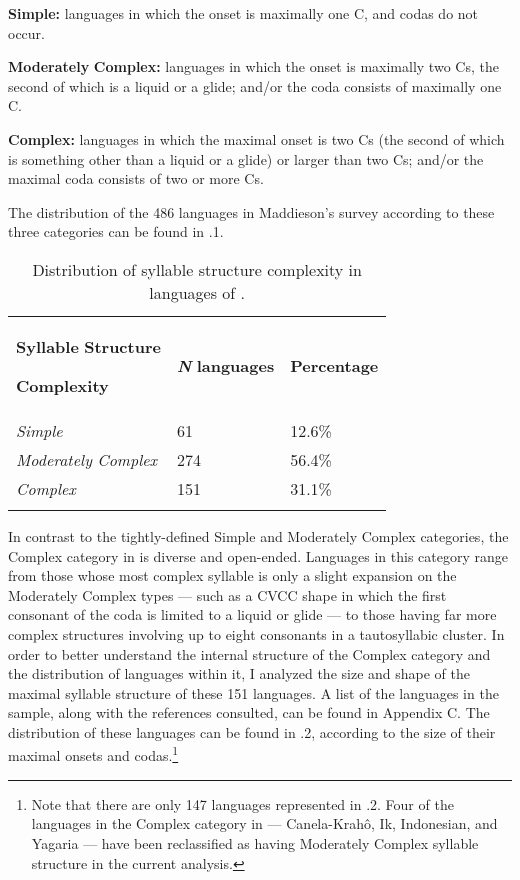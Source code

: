 \textbf{Simple:} languages in which the onset is maximally one C, and codas do not occur.



\textbf{Moderately} \textbf{Complex:} languages in which the onset is maximally two Cs, the second of which is a liquid or a glide; and/or the coda consists of maximally one C.



\textbf{Complex:} languages in which the maximal onset is two Cs (the second of which is something other than a liquid or a glide) or larger than two Cs; and/or the maximal coda consists of two or more Cs.



The distribution of the 486 languages in Maddieson's survey according to these three categories can be found in .1.






\begin{table}
\begin{tabularx}{\textwidth}{XXX}
\lsptoprule

\textbf{Syllable} \textbf{Structure} 

\textbf{Complexity} & \textbf{\textit{N}} \textbf{languages} & \textbf{Percentage}\\
\textit{Simple} & 61 & 12.6\%\\
\textit{Moderately} \textit{Complex} & 274 & 56.4\%\\
\textit{Complex} & 151 & 31.1\%\\
\lspbottomrule
\end{tabularx}
\caption{\label{tab:key:2.1.} Distribution of syllable structure complexity in languages of \citet{Maddieson2013a}.}
\end{table}




  In contrast to the tightly-defined Simple and Moderately Complex categories, the Complex category in \citet{Maddieson2013a} is diverse and open-ended. Languages in this category range from those whose most complex syllable is only a slight expansion on the Moderately Complex types — such as a CVCC shape in which the first consonant of the coda is limited to a liquid or glide — to those having far more complex structures involving up to eight consonants in a tautosyllabic cluster. In order to better understand the internal structure of the Complex category and the distribution of languages within it, I analyzed the size and shape of the maximal syllable structure of these 151 languages. A list of the languages in the sample, along with the references consulted, can be found in Appendix C. The distribution of these languages can be found in .2, according to the size of their maximal onsets and codas.\footnote{ \textrm{Note that there are only 147 languages represented in .2. Four of the languages in the Complex category in \citet{Maddieson2013a} — Canela-Krahô, Ik, Indonesian, and Yagaria — have been reclassified as having Moderately Complex syllable structure in the current analysis.}}






